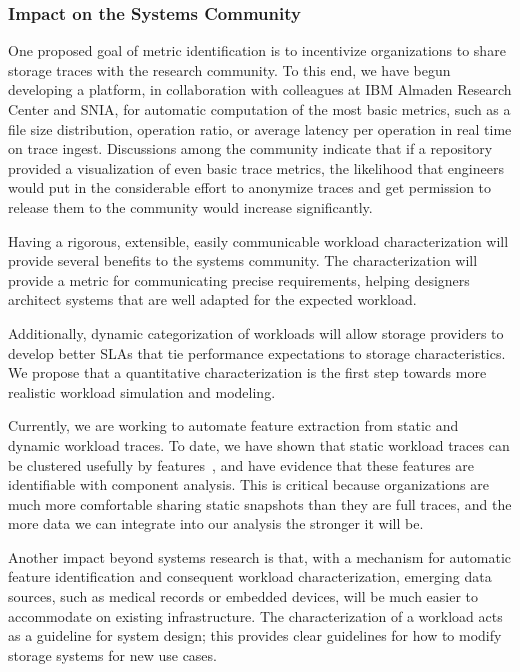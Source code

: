 \subsubsection*{Impact on the Systems Community}

One proposed goal of metric identification is to incentivize organizations to
share storage traces with the research community.  To this end, we have begun
developing a platform, in collaboration with colleagues at IBM Almaden Research
Center and SNIA, for automatic computation of the most basic metrics, such
as a file size distribution, operation ratio, or average latency per operation
in real time on trace ingest.  Discussions among the community indicate that if
a repository provided a visualization of even basic trace metrics, the
likelihood that engineers would put in the considerable effort to anonymize
traces and get permission to release them to the community would increase
significantly.  

Having a rigorous, extensible, easily communicable workload characterization
will provide several benefits to the systems community.  The characterization
will provide a metric for communicating precise requirements, helping designers
architect systems that are well adapted for the expected workload.

Additionally, dynamic categorization of workloads will allow storage providers to
develop better SLAs that tie performance expectations to storage
characteristics.  We propose that a quantitative characterization is
the first step towards more realistic workload simulation and modeling.

Currently, we are working to automate feature extraction from static and dynamic
workload traces. To date, we have shown that static workload traces can be
clustered usefully by features~\cite{static}, and have evidence that these
features are identifiable with component analysis.  This is critical because
organizations are much more comfortable sharing static snapshots than they are
full traces, and the more data we can integrate into our analysis the stronger
it will be.  

Another impact beyond systems research is that, with a mechanism for automatic
feature identification and consequent workload characterization, emerging data
sources, such as medical records or embedded devices, will be much easier to
accommodate on existing infrastructure.  The characterization of a workload acts
as a guideline for system design; this provides clear guidelines for how to
modify storage systems for new use cases.

